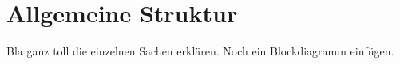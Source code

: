 \chapter{Allgemeine Struktur}
Bla ganz toll die einzelnen Sachen erklären. Noch ein Blockdiagramm einfügen.


